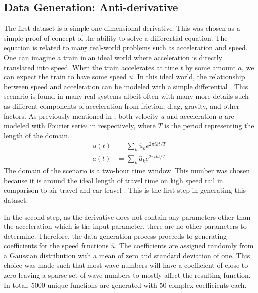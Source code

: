 \subsection{Data Generation: Anti-derivative}
\noindent The first dataset is a simple one dimensional derivative. This was chosen as a simple proof of concept of the ability to solve a differential equation. The equation is related to many real-world problems such as acceleration and speed. One can imagine a train in an ideal world where acceleration is directly translated into speed. When the train accelerates at time \(t \) by some amount \(a \), we can expect the train to have some speed \(u \). In this ideal world, the relationship between speed and acceleration can be modeled with a simple differential . This scenario is found in many real systems albeit often with many more details such as different components of acceleration from friction, drag, gravity, and other factors.
As previously mentioned in , both velocity \(u \) and acceleration \(a \) are modeled with Fourier series in  respectively, where \(T\) is the period representing the length of the domain.
\begin{align}
  u\left( t \right) & = \sum_{k} \hat{u}_k e^{2\pi ikt/T} \label{eq:fourier_speed}        \\
  a\left( t \right) & = \sum_{k} \hat{a}_k e^{2\pi ikt/T} \label{eq:fourier_acceleration}
\end{align}
The domain of the scenario is a two-hour time window. This number was chosen because it is around the ideal length of travel time on high speed rail in comparison to air travel and car travel \autocite{givoniDevelopmentImpactModern2006,wangEfficiencySpatialEquity2019,wrro2236}. This is the first step in generating this dataset.

In the second step, as the derivative  does not contain any parameters other than the acceleration which is the input parameter, there are no other parameters to determine. Therefore, the data generation process proceeds to generating coefficients for the speed functions \(\hat{u} \). The coefficients are assigned randomly from a Gaussian distribution with a mean of zero and standard deviation of one. This choice was made such that most wave numbers will have a coefficient of close to zero leaving a sparse set of wave numbers to mostly affect the resulting function. In total, \num{5000} unique functions are generated with \num{50} complex coefficients each.

